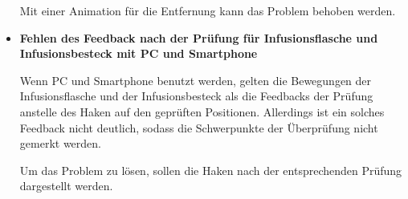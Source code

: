 \begin{itemize}
    Mit einer Animation für die Entfernung kann das Problem behoben werden.
    
    \item \textbf{Fehlen des Feedback nach der Prüfung für Infusionsflasche und Infusionsbesteck mit PC und Smartphone}
    
    Wenn PC und Smartphone benutzt werden, gelten die Bewegungen der Infusionsflasche und der Infusionsbesteck als die Feedbacks der Prüfung anstelle des Haken auf den geprüften Positionen. Allerdings ist ein solches Feedback nicht deutlich, sodass die Schwerpunkte der Überprüfung nicht gemerkt werden.
    
    Um das Problem zu lösen, sollen die Haken nach der entsprechenden Prüfung dargestellt werden.
\end{itemize}












